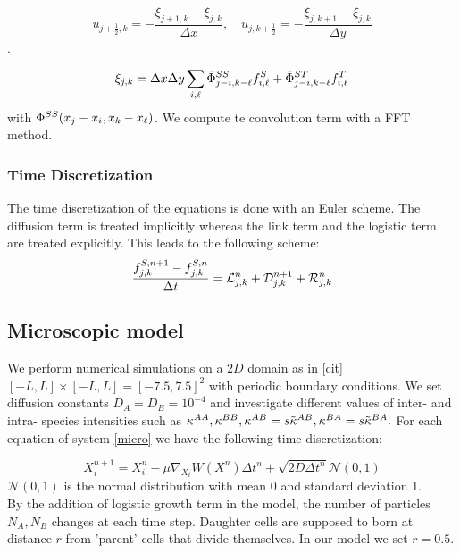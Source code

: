 $$u_{j+\frac{1}{2},k}=-\frac{\xi_{j+1,k}-\xi_{j,k}}{\Delta x}, \quad u_{j,k+\frac{1}{2}}=-\frac{\xi_{j,k+1}-\xi_{j,k}}{\Delta y}$$.


$$ \xi_{j,k}=\Delta x \Delta y \sum_{i,{\ell}} \tilde{\Phi}^{SS}_{j-i,k-{\ell}} f^{S}_{i,{\ell}}+
\tilde{\Phi}^{ST}_{j-i,k-{\ell}} f^{T}_{i,{\ell}} $$
with ${\Phi}^{SS}(x_j-x_i,x_k-x_{{\ell}})$. We compute te convolution term with a FFT method.
% 


\subsubsection{Time Discretization}

The time discretization of the equations is done with an Euler scheme. The diffusion term is treated implicitly whereas the link term and the logistic term are treated explicitly. This leads to the following scheme:
\begin{equation}
	\frac{f_{j,k}^{S,n+1}-f_{j,k}^{S,n}}{\Delta t}={\mathcal{L}}_{j,k}^n+{\mathcal{D}}_{j,k}^{n+1}+{\mathcal{R}}_{j,k}^n
\end{equation}
\subsection{Microscopic model}
We perform numerical simulations on a $2D$ domain as in [cit] $[-L, L]\times[-L,L]=[-7.5,7.5]^2$ with periodic boundary conditions. We set diffusion constants $D_A=D_B=10^{-4}$ and investigate different values of inter- and intra- species intensities such as $\kappa^{AA}, \kappa^{BB}, \kappa^{AB}=s\tilde{\kappa}^{AB},  \kappa^{BA}=s\tilde{\kappa}^{BA}.$ For each equation of system \eqref{micro} we have the following time discretization:

\begin{equation}
X_i^{n+1}=X_i^{n}-\mu\nabla_{X_i} W(X^n)\Delta t^n+\sqrt{2D \Delta t^n}\mathcal{N}(0,1)
\end{equation}
 $\mathcal{N}(0,1)$ is the normal distribution with mean 0 and standard
deviation 1. \\
By the addition of logistic growth term in the model, the number of particles $N_A, N_B$ changes at each time step. Daughter cells are supposed to born at distance $r$ from 'parent' cells that divide themselves. In our model we set $r=0.5$.

